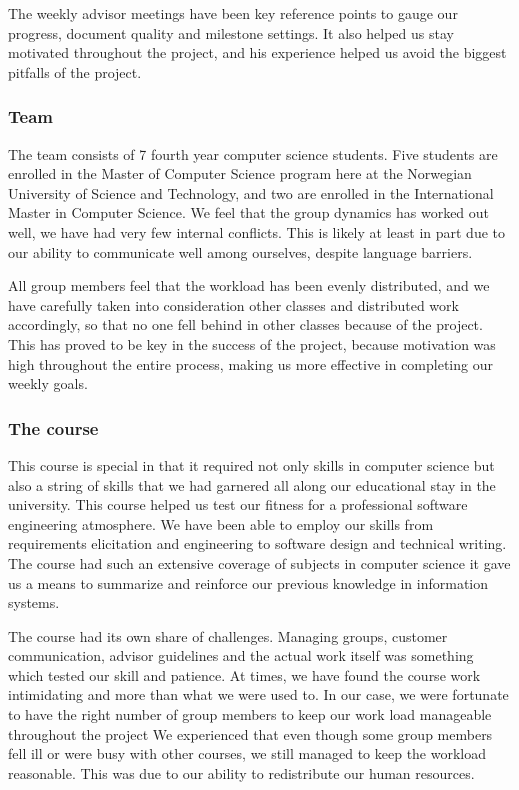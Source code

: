 The weekly advisor meetings have been key reference points to gauge our
progress, document quality and milestone settings. It also helped us stay
motivated throughout the project, and his experience helped us avoid the biggest
pitfalls of the project.

\subsubsection{Team}
  The team consists of 7 fourth year computer science students.
  Five students are enrolled in the Master of Computer
  Science program here at the Norwegian University of
  Science and Technology, and two are enrolled in the International Master in Computer
  Science. We feel that the group dynamics has worked out well, we have had very few internal conflicts. 
  This is likely at least in part due to our ability to communicate well among ourselves, despite language barriers.
  
  All group members feel that the workload has been evenly distributed, and we
  have carefully taken into consideration other classes and distributed work
  accordingly, so that no one fell behind in other classes because of the
  project. This has proved to be key in the success of the project, because
  motivation was high throughout the entire process, making us more effective in
  completing our weekly goals.

\subsubsection{The course}

   This course is special in that it required not only skills
   in computer science but also a string of skills that we had garnered all
   along our educational stay in the university. This course helped us test our
   fitness for a professional software engineering atmosphere. We have been able
   to employ our skills from requirements elicitation and engineering to
   software design and technical writing. The course had such an extensive
   coverage of subjects in computer science it gave us a means to
   summarize and reinforce our previous knowledge in information systems.

   The course had its own share of challenges. Managing groups, customer
   communication, advisor guidelines and the actual work itself was something
   which tested our skill and patience. At times, we have found the course work
    intimidating and more than what we were used to. In our case,
   we were fortunate to have the right number of group members to keep our work load manageable throughout the project
   We experienced that even though some group
   members fell ill or were busy with other courses, we still managed to
   keep the workload reasonable. This was due to our ability to redistribute our human resources.
   

